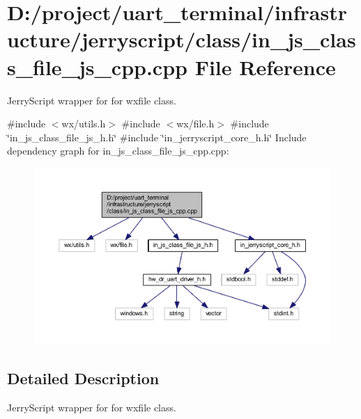 \section{D\+:/project/uart\+\_\+terminal/infrastructure/jerryscript/class/in\+\_\+js\+\_\+class\+\_\+file\+\_\+js\+\_\+cpp.cpp File Reference}
\label{in__js__class__file__js__cpp_8cpp}


Jerry\+Script wrapper for for wxfile class.  


{\ttfamily \#include $<$wx/utils.\+h$>$}\newline
{\ttfamily \#include $<$wx/file.\+h$>$}\newline
{\ttfamily \#include \char`\"{}in\+\_\+js\+\_\+class\+\_\+file\+\_\+js\+\_\+h.\+h\char`\"{}}\newline
{\ttfamily \#include \char`\"{}in\+\_\+jerryscript\+\_\+core\+\_\+h.\+h\char`\"{}}\newline
Include dependency graph for in\+\_\+js\+\_\+class\+\_\+file\+\_\+js\+\_\+cpp.\+cpp\+:\nopagebreak
\begin{figure}[H]
\begin{center}
\leavevmode
\includegraphics[width=350pt]{in__js__class__file__js__cpp_8cpp__incl}
\end{center}
\end{figure}


\subsection{Detailed Description}
Jerry\+Script wrapper for for wxfile class. 


